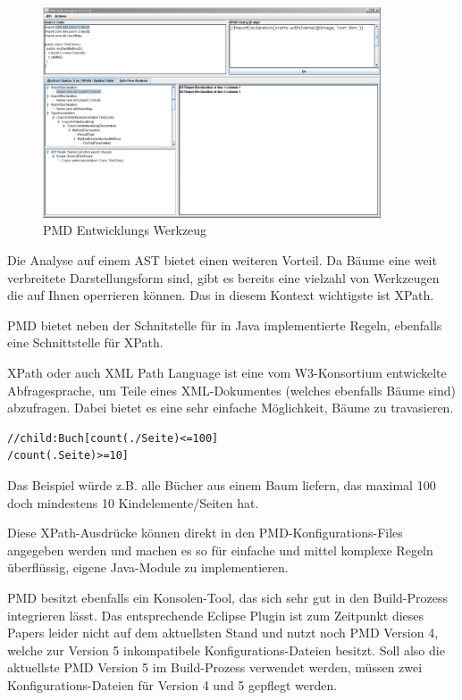 \begin{figure}[htbp]
\includegraphics[width=10cm]{pmd-dev}
\caption{PMD Entwicklungs Werkzeug}
\end{figure}

Die Analyse auf einem AST bietet einen weiteren Vorteil. Da Bäume eine weit verbreitete Darstellungsform sind, gibt es bereits eine vielzahl von Werkzeugen die auf Ihnen operrieren können. Das in diesem Kontext wichtigste ist XPath.

PMD bietet neben der Schnitstelle für in Java implementierte Regeln, ebenfalls eine Schnittstelle für XPath. 

XPath oder auch XML Path Language ist eine vom W3-Konsortium entwickelte Abfragesprache, um Teile eines XML-Dokumentes (welches ebenfalls Bäume sind) abzufragen. Dabei bietet es eine sehr einfache Möglichkeit, Bäume zu travasieren.

\begin{lstlisting}
//child:Buch[count(./Seite)<=100]
/count(.Seite)>=10]
\end{lstlisting}

Das Beispiel würde z.B. alle Bücher aus einem Baum liefern, das maximal 100 doch mindestens 10 Kindelemente/Seiten hat.

Diese XPath-Ausdrücke können direkt in den PMD-Konfigurations-Files angegeben werden und machen es so für einfache und mittel komplexe Regeln überflüssig, eigene Java-Module zu implementieren.

PMD besitzt ebenfalls ein Konsolen-Tool, das sich sehr gut in den Build-Prozess integrieren lässt. Das entsprechende Eclipse Plugin ist zum Zeitpunkt dieses Papers leider nicht auf dem aktuellsten Stand und nutzt noch PMD Version 4, welche zur Version 5 inkompatibele Konfigurations-Dateien besitzt. Soll also die aktuellste PMD Version 5 im Build-Prozess verwendet werden, müssen zwei Konfigurations-Dateien für Version 4 und 5 gepflegt werden.


